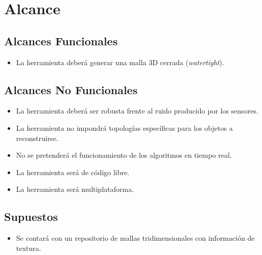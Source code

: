 	\section{Alcance}
		\subsection{Alcances Funcionales}
		\begin{itemize}
			\item La herramienta deberá generar una malla 3D cerrada (\emph{watertight}).
		\end{itemize}
		\subsection{Alcances No Funcionales}
		\begin{itemize}
			\item La herramienta deberá ser robusta frente al ruido producido por los sensores.
			\item La herramienta no impondrá topologías específicas para los objetos a reconstruirse.
			\item No se pretenderá el funcionamiento de los algoritmos en tiempo real.
			\item La herramienta será de código libre.
			\item La herramienta será multiplataforma.
		\end{itemize}
		\subsection{Supuestos}
		\begin{itemize}
			\item Se contará con un repositorio de mallas tridimensionales con información de textura.
		\end{itemize}
